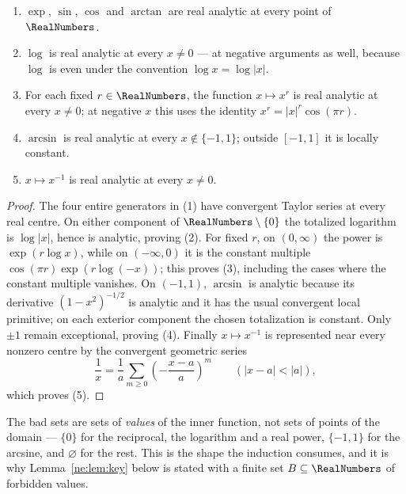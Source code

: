 \begin{lemma}\label{ne:lem:generators}
\leavevmode
\begin{enumerate}
\item $\exp$, $\sin$, $\cos$ and $\arctan$ are real analytic at every point
      of $\RealNumbers$.
\item $\log$ is real analytic at every $x\ne 0$ --- at negative arguments as
      well, because $\log$ is even under the convention $\log x=\log|x|$.
\item For each fixed $r\in\RealNumbers$, the function $x\mapsto x^{r}$ is real analytic
      at every $x\ne 0$; at negative $x$ this uses the identity
      $x^{r}=|x|^{r}\cos(\pi r)$.
\item $\arcsin$ is real analytic at every $x\notin\{-1,1\}$; outside
      $[-1,1]$ it is locally constant.
\item $x\mapsto x^{-1}$ is real analytic at every $x\ne 0$.
\end{enumerate}
\end{lemma}

\begin{proof}
The four entire generators in (1) have convergent Taylor series at every real
centre.  On either component of $\RealNumbers\setminus\{0\}$ the totalized
logarithm is $\log|x|$, hence is analytic, proving (2).  For fixed $r$, on
$(0,\infty)$ the power is $\exp(r\log x)$, while on $(-\infty,0)$ it is the
constant multiple $\cos(\pi r)\exp(r\log(-x))$; this proves (3), including
the cases where the constant multiple vanishes.  On $(-1,1)$, $\arcsin$ is
analytic because its derivative $(1-x^2)^{-1/2}$ is analytic and it has the
usual convergent local primitive; on each exterior component the chosen
totalization is constant.  Only $\pm1$ remain exceptional, proving (4).
Finally $x\mapsto x^{-1}$ is represented near every nonzero centre by the
convergent geometric series
\[
 \frac1x=\frac1a\sum_{m\ge0}\left(-\frac{x-a}{a}\right)^m
 \qquad(|x-a|<|a|),
\]
which proves (5).
\end{proof}

\begin{remark}
The bad sets are sets of \emph{values} of the inner function, not sets of
points of the domain --- $\{0\}$ for the reciprocal, the logarithm and a real
power, $\{-1,1\}$ for the arcsine, and $\varnothing$ for the rest.  This is
the shape the induction consumes, and it is why Lemma~\ref{ne:lem:key} below is stated
with a finite set $B\subseteq\RealNumbers$ of forbidden values.
\end{remark}

